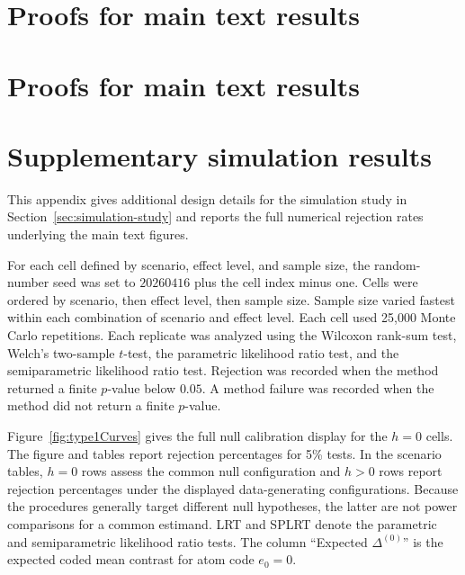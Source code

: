 \documentclass[11pt]{article}
\begin{document}
\fi

\ifManuscriptIncludeSupplement
\clearpage
\appendix
\ifProofsExternal
\section{Proofs for main text results}\label{app:main-text-proofs}
\else\ifProofsToAppendix
\section{Proofs for main text results}\label{app:main-text-proofs}
\printProofs[mainproofs]
\fi
\fi
\section{Supplementary simulation results}\label{app:supplementary-simulation-results}

This appendix gives additional design details for the simulation study in Section~\ref{sec:simulation-study} and reports the full numerical rejection rates underlying the main text figures.

For each cell defined by scenario, effect level, and sample size, the random-number seed was set to $20260416$ plus the cell index minus one. Cells were ordered by scenario, then effect level, then sample size. Sample size varied fastest within each combination of scenario and effect level. Each cell used 25,000 Monte Carlo repetitions. Each replicate was analyzed using the Wilcoxon rank-sum test, Welch's two-sample $t$-test, the parametric likelihood ratio test, and the semiparametric likelihood ratio test. Rejection was recorded when the method returned a finite $p$-value below $0.05$. A method failure was recorded when the method did not return a finite $p$-value.

Figure~\ref{fig:type1Curves} gives the full null calibration display for the $h=0$ cells. The figure and tables report rejection percentages for 5\% tests. In the scenario tables, $h=0$ rows assess the common null configuration and $h>0$ rows report rejection percentages under the displayed data-generating configurations. Because the procedures generally target different null hypotheses, the latter are not power comparisons for a common estimand. LRT and SPLRT denote the parametric and semiparametric likelihood ratio tests. The column ``Expected $\Delta^{(0)}$'' is the expected coded mean contrast for atom code $e_0=0$.
\end{document}
